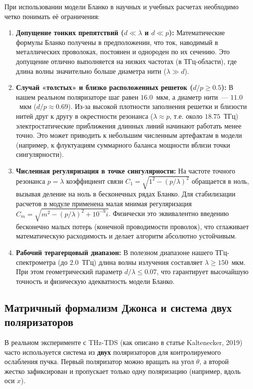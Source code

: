 При использовании модели Бланко в научных и учебных расчетах необходимо четко понимать её ограничения:
\begin{enumerate}
    \item \textbf{Допущение тонких препятствий ($d \ll \lambda$ и $d \ll p$):}
    Математические формулы Бланко получены в предположении, что ток, наводимый в металлических проволоках, постоянен и однороден по их сечению. Это допущение отлично выполняется на низких частотах (в ТГц-области), где длина волны значительно больше диаметра нити ($\lambda \gg d$).
    
    \item \textbf{Случай «толстых» и близко расположенных решеток ($d/p \ge 0.5$):}
    В нашем реальном поляризаторе шаг равен $16.0$~мкм, а диаметр нити~--- $11.0$~мкм ($d/p \approx 0.69$). Из-за высокой плотности заполнения решетки и близости нитей друг к другу в окрестности резонанса ($\lambda \approx p$, т.е. около $18.75$~ТГц) электростатические приближения длинных линий начинают работать менее точно. Это может приводить к небольшим численным артефактам в модели (например, к флуктуациям суммарного баланса мощности вблизи точки сингулярности).
    
    \item \textbf{Численная регуляризация в точке сингулярности:}
    На частоте точного резонанса $p = \lambda$ коэффициент связи $C_1 = \sqrt{1^2 - (p/\lambda)^2}$ обращается в ноль, вызывая деление на ноль в бесконечных рядах Бланко. Для стабилизации расчетов в модуле  применена малая мнимая регуляризация $C_m = \sqrt{m^2 - (p/\lambda)^2 + 10^{-9}i}$. Физически это эквивалентно введению бесконечно малых потерь (конечной проводимости проволок), что сглаживает математическую расходимость и делает алгоритм абсолютно устойчивым.
    
    \item \textbf{Рабочий терагерцовый диапазон:}
    В полезном диапазоне нашего ТГц-спектрометра (до $2.0$~ТГц) длина волны излучения составляет $\lambda \ge 150$~мкм. При этом геометрический параметр $d/\lambda \le 0.07$, что гарантирует высочайшую точность и физическую адекватность модели Бланко.
\end{enumerate}

\subsection{Матричный формализм Джонса и система двух поляризаторов}

В реальном эксперименте с THz-TDS (как описано в статье Kaltenecker, 2019) часто используется система из \textbf{двух} поляризаторов для контролируемого ослабления пучка. Первый поляризатор можно вращать на угол $\theta$, а второй жестко зафиксирован и пропускает только одну поляризацию (например, вдоль оси $x$).


